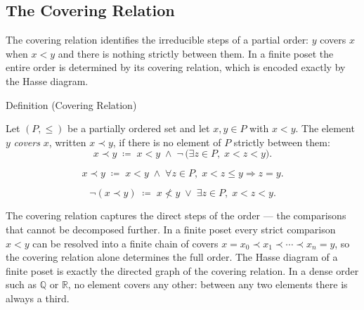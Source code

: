 
\subsection{The Covering Relation}
\label{sec:covering-relation}

\begin{remark*}
The covering relation identifies the irreducible steps of a partial order:
$y$ covers $x$ when $x < y$ and there is nothing strictly between them.
In a finite poset the entire order is determined by its covering relation,
which is encoded exactly by the Hasse diagram.
\end{remark*}


\begin{definitionbox}{Definition (Covering Relation)}
\begin{definition}
\label{def:covering-relation}
Let $(P, \leq)$ be a partially ordered set and let $x, y \in P$ with
$x < y$.  The element $y$ \emph{covers} $x$, written $x \prec y$, if
there is no element of $P$ strictly between them:
\[
x \prec y
\;\coloneqq\;
x < y
\;\land\;
\neg\,\bigl(\exists z \in P,\; x < z < y\bigr).
\]
\end{definition}
\end{definitionbox}

\begin{remark*}
\[
x \prec y
\;\coloneqq\;
x < y
\;\land\;
\forall z \in P,\; x < z \leq y \Longrightarrow z = y.
\]
\end{remark*}

\begin{remark*}
\[
\neg(x \prec y)
\;\coloneqq\;
x \not< y \;\lor\; \exists z \in P,\; x < z < y.
\]
\end{remark*}

\begin{remark*}[Interpretation]
The covering relation captures the direct steps of the order --- the
comparisons that cannot be decomposed further.  In a finite poset every
strict comparison $x < y$ can be resolved into a finite chain of covers
$x = x_0 \prec x_1 \prec \cdots \prec x_n = y$, so the covering relation
alone determines the full order.  The Hasse diagram of a finite poset is
exactly the directed graph of the covering relation.  In a dense order
such as $\mathbb{Q}$ or $\mathbb{R}$, no element covers any other: between
any two elements there is always a third.
\end{remark*}

